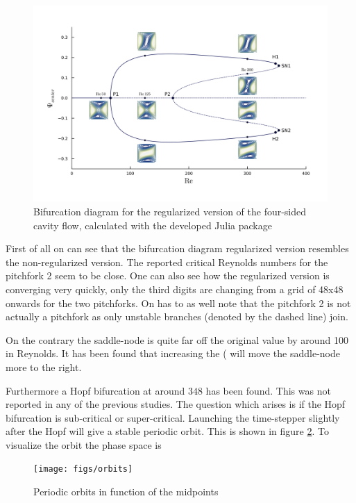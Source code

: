 \begin{figure}[h!]
  \begin{center}
  \includegraphics[width=\textwidth]{figs/bifurcation_diag64x64.png}
  \end{center}
  \label{fig:bif_diag}
  \caption{Bifurcation diagram for the regularized version of the four-sided
    cavity flow, calculated with the developed Julia package} 
\end{figure}

First of all on can see that the bifurcation diagram regularized version
resembles the non-regularized version. The reported critical Reynolds numbers
for the pitchfork 2 seem to be close. One can also see how the regularized
version is converging very quickly, only the third digits are changing from a
grid of 48x48 onwards for the two pitchforks. On has to as well note that the
pitchfork 2 is not actually a pitchfork as only unstable branches (denoted by
the dashed line) join.   

On the contrary the saddle-node is quite far off the original value by around
100 in Reynolds. It has been found that increasing the ( will move the
saddle-node more to the right. 

Furthermore a Hopf bifurcation at around $348$ has been found. This was not
reported in any of the previous studies. The question which arises is if the
Hopf bifurcation is sub-critical or super-critical. Launching the time-stepper
slightly after the Hopf will give a stable periodic orbit. This is shown in
figure \ref{fig:orbit}. To visualize the orbit the phase space is    

\begin{figure}[h!]
  \begin{center}
  \texttt{[image: figs/orbits]}
  \end{center}
  \label{fig:orbit}
  \caption{Periodic orbits in function of the midpoints} 
\end{figure}

